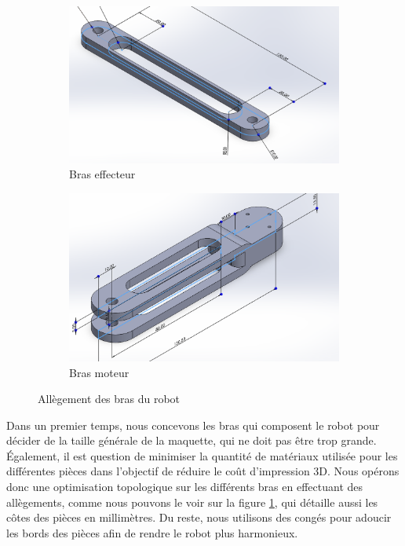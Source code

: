 \documentclass[a4paper, 11pt]{report}
\begin{document}
\begin{figure}[h]
    \centering
    \begin{subfigure}[t]{0.50\textwidth}
        \centering
        \includegraphics[width=\textwidth]{Figures/bras_effecteur.png}
        \caption{Bras effecteur}
    \end{subfigure}
    \hfill
    \begin{subfigure}[t]{0.45\textwidth}
        \centering
        \includegraphics[width=\textwidth]{Figures/bras_moteur.png}
        \caption{Bras moteur}
    \end{subfigure}
    \caption{Allègement des bras du robot}
    \label{fig:bras}
\end{figure}

Dans un premier temps, nous concevons les bras qui composent le robot pour décider de la taille générale de la maquette, qui ne doit pas être trop grande.
Également, il est question de minimiser la quantité de matériaux utilisée pour les différentes pièces dans l'objectif de réduire le coût d'impression 3D.
Nous opérons donc une optimisation topologique sur les différents bras en effectuant des allègements, comme nous pouvons le voir sur la figure \ref{fig:bras}, 
qui détaille aussi les côtes des pièces en millimètres. Du reste, nous utilisons des congés pour adoucir les bords des pièces afin de rendre le robot plus harmonieux.
\end{document}
